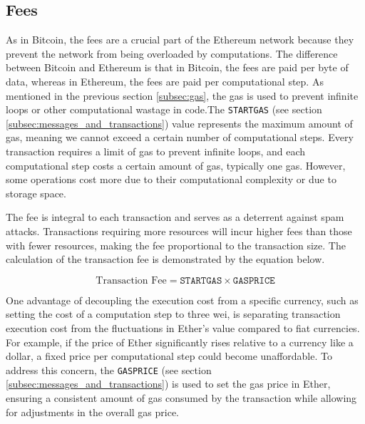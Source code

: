 
\subsection{Fees}
\label{subsec:fees}


As in Bitcoin, the fees are a crucial part of the Ethereum network because they prevent the network from being overloaded by computations. The difference between Bitcoin 
and Ethereum is that in Bitcoin, the fees are paid per byte of data, whereas in Ethereum, the fees are paid per computational step. As mentioned in the previous section 
\ref{subsec:gas}, the gas is used to prevent infinite loops or other computational wastage in code.The \texttt{STARTGAS} (see section \ref{subsec:messages_and_transactions}) 
value represents the maximum amount of gas, meaning we cannot exceed a certain number of computational steps. Every transaction requires a limit of gas to prevent infinite loops, and each computational step costs a certain 
amount of gas, typically one gas. However, some operations cost more due to their computational complexity or due to storage space.

The fee is integral to each transaction and serves as a deterrent against spam attacks. Transactions requiring more resources will incur higher fees than those with fewer resources, making the fee proportional to the transaction size. The calculation of the transaction fee is demonstrated by the equation below.


\begin{equation}
   \label{eq:transaction_fee}
   \text{Transaction Fee} = \texttt{STARTGAS} \times \texttt{GASPRICE}
\end{equation}


One advantage of decoupling the execution cost from a specific currency, such as setting the cost of a computation step to three wei, is separating transaction 
execution cost from the fluctuations in Ether's value compared to fiat currencies. For example, if the price of Ether significantly rises relative to a currency like a 
dollar, a fixed price per computational step could become unaffordable. To address this concern, the \texttt{GASPRICE} (see section \ref{subsec:messages_and_transactions}) 
is used to set the gas price in Ether, ensuring a consistent amount of gas consumed by the transaction while allowing for adjustments in the overall gas price.



